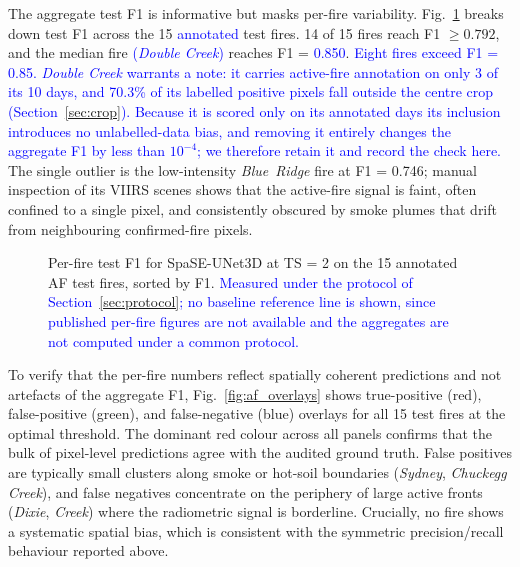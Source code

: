\documentclass[sensors,article,submit,moreauthors,pdftex]{Definitions/mdpi}
\newcommand{\rev}[1]{\textcolor{blue}{#1}}
\begin{document}
The aggregate test F1 is informative but masks per-fire variability. Fig.~\ref{fig:af_per_fire} breaks down test F1 across the 15 \rev{annotated} test fires. 14 of 15 fires reach F1 $\geq 0.792$, and the median fire \rev{(\textit{Double Creek})} reaches F1 = \rev{0.850}. \rev{Eight fires exceed F1 = 0.85. \textit{Double Creek} warrants a note: it carries active-fire annotation on only 3 of its 10 days, and 70.3\% of its labelled positive pixels fall outside the centre crop (Section~\ref{sec:crop}). Because it is scored only on its annotated days its inclusion introduces no unlabelled-data bias, and removing it entirely changes the aggregate F1 by less than $10^{-4}$; we therefore retain it and record the check here.} The single outlier is the low-intensity \textit{Blue~Ridge} fire at F1 = 0.746; manual inspection of its VIIRS scenes shows that the active-fire signal is faint, often confined to a single pixel, and consistently obscured by smoke plumes that drift from neighbouring confirmed-fire pixels.

\begin{figure}[H]
\centering

\caption{Per-fire test F1 for SpaSE-UNet3D at TS = 2 on the 15 annotated AF test fires, sorted by F1. \rev{Measured under the protocol of Section~\ref{sec:protocol}; no baseline reference line is shown, since published per-fire figures are not available and the aggregates are not computed under a common protocol.}}
\label{fig:af_per_fire}
\end{figure}

To verify that the per-fire numbers reflect spatially coherent predictions and not artefacts of the aggregate F1, Fig.~\ref{fig:af_overlays} shows true-positive (red), false-positive (green), and false-negative (blue) overlays for all 15 test fires at the optimal threshold. The dominant red colour across all panels confirms that the bulk of pixel-level predictions agree with the audited ground truth. False positives are typically small clusters along smoke or hot-soil boundaries (\textit{Sydney}, \textit{Chuckegg Creek}), and false negatives concentrate on the periphery of large active fronts (\textit{Dixie}, \textit{Creek}) where the radiometric signal is borderline. Crucially, no fire shows a systematic spatial bias, which is consistent with the symmetric precision/recall behaviour reported above.
\end{document}

